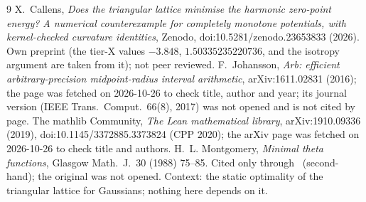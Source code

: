 \documentclass[10pt]{article}
\begin{document}
\begin{thebibliography}{9}\small
{} X.~Callens, \emph{Does the triangular lattice minimise the harmonic zero-point energy? A numerical counterexample for completely monotone potentials, with kernel-checked curvature identities}, Zenodo, doi:10.5281/zenodo.23653833 (2026). Own preprint (the tier-X values $-3.848$, $1.50335235220736$, and the isotropy argument are taken from it); not peer reviewed.
 F.~Johansson, \emph{Arb: efficient arbitrary-precision midpoint-radius interval arithmetic}, arXiv:1611.02831 (2016); the page was fetched on 2026-10-26 to check title, author and year; its journal version (IEEE Trans.\ Comput.\ 66(8), 2017) was not opened and is not cited by page.
 The mathlib Community, \emph{The Lean mathematical library}, arXiv:1910.09336 (2019), doi:10.1145/3372885.3373824 (CPP 2020); the arXiv page was fetched on 2026-10-26 to check title and authors.
 H.~L. Montgomery, \emph{Minimal theta functions}, Glasgow Math.\ J.\ 30 (1988) 75--85. Cited only through~\cite{p2} (second-hand); the original was not opened. Context: the static optimality of the triangular lattice for Gaussians; nothing here depends on it.
\end{thebibliography}
\end{document}
